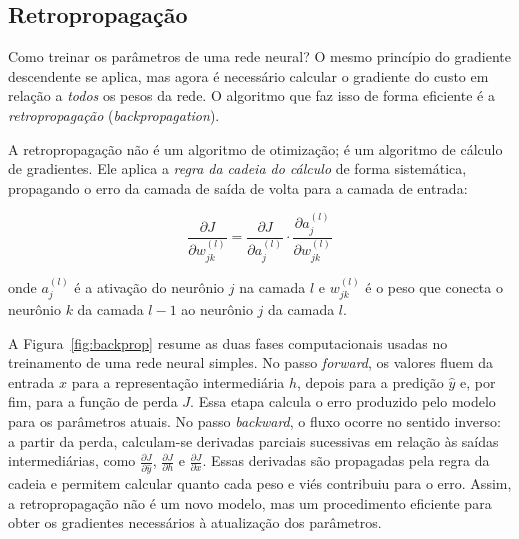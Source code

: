 \documentclass[12pt,a4paper]{article}
\begin{document}
\subsection{Retropropagação}
\label{subsec:backprop}

Como treinar os parâmetros de uma rede neural? O mesmo princípio do gradiente descendente se aplica, mas agora é necessário calcular o gradiente do custo em relação a \emph{todos} os pesos da rede. O algoritmo que faz isso de forma eficiente é a \emph{retropropagação} (\textit{backpropagation}).

A retropropagação não é um algoritmo de otimização; é um algoritmo de cálculo de gradientes. Ele aplica a \emph{regra da cadeia do cálculo} de forma sistemática, propagando o erro da camada de saída de volta para a camada de entrada:

\[
\frac{\partial J}{\partial w^{(l)}_{jk}} = \frac{\partial J}{\partial a^{(l)}_j} \cdot \frac{\partial a^{(l)}_j}{\partial w^{(l)}_{jk}}
\]

onde $a^{(l)}_j$ é a ativação do neurônio $j$ na camada $l$ e $w^{(l)}_{jk}$ é o peso que conecta o neurônio $k$ da camada $l-1$ ao neurônio $j$ da camada $l$.

A Figura~\ref{fig:backprop} resume as duas fases computacionais usadas no treinamento de uma rede neural simples. No passo \textit{forward}, os valores fluem da entrada $x$ para a representação intermediária $h$, depois para a predição $\hat{y}$ e, por fim, para a função de perda $J$. Essa etapa calcula o erro produzido pelo modelo para os parâmetros atuais. No passo \textit{backward}, o fluxo ocorre no sentido inverso: a partir da perda, calculam-se derivadas parciais sucessivas em relação às saídas intermediárias, como $\frac{\partial J}{\partial \hat{y}}$, $\frac{\partial J}{\partial h}$ e $\frac{\partial J}{\partial x}$. Essas derivadas são propagadas pela regra da cadeia e permitem calcular quanto cada peso e viés contribuiu para o erro. Assim, a retropropagação não é um novo modelo, mas um procedimento eficiente para obter os gradientes necessários à atualização dos parâmetros.
\end{document}
